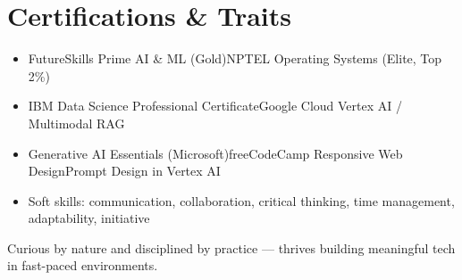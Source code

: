 \documentclass[a4paper,10pt]{article}
\newcommand{\sep}{\quad\textbullet\quad}
\begin{document}
\section*{Certifications \& Traits}
\begin{itemize}
  \item FutureSkills Prime AI \& ML (Gold)\sep NPTEL Operating Systems (Elite, Top 2\%)
  \item IBM Data Science Professional Certificate\sep Google Cloud Vertex AI / Multimodal RAG
  \item Generative AI Essentials (Microsoft)\sep freeCodeCamp Responsive Web Design\sep Prompt Design in Vertex AI
  \item Soft skills: communication, collaboration, critical thinking, time management, adaptability, initiative
\end{itemize}

\vspace{4pt}
\noindent Curious by nature and disciplined by practice --- thrives building meaningful tech in fast-paced environments.
\end{document}
